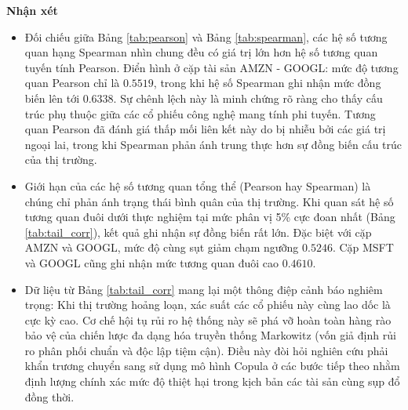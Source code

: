 \begin{flushleft}
\textbf{Nhận xét}
\begin{itemize} 
    \item Đối chiếu giữa Bảng \ref{tab:pearson} và Bảng \ref{tab:spearman}, các hệ số tương quan hạng Spearman nhìn chung đều có giá trị lớn hơn hệ số tương quan tuyến tính Pearson. Điển hình ở cặp tài sản AMZN - GOOGL: mức độ tương quan Pearson chỉ là $0.5519$, trong khi hệ số Spearman ghi nhận mức đồng biến lên tới $0.6338$. Sự chênh lệch này là minh chứng rõ ràng cho thấy cấu trúc phụ thuộc giữa các cổ phiếu công nghệ mang tính phi tuyến. Tương quan Pearson đã đánh giá thấp mối liên kết này do bị nhiễu bởi các giá trị ngoại lai, trong khi Spearman phản ánh trung thực hơn sự đồng biến cấu trúc của thị trường.
    \item Giới hạn của các hệ số tương quan tổng thể (Pearson hay Spearman) là chúng chỉ phản ánh trạng thái bình quân của thị trường. Khi quan sát hệ số tương quan đuôi dưới thực nghiệm tại mức phân vị 5\% cực đoan nhất (Bảng \ref{tab:tail_corr}), kết quả ghi nhận sự đồng biến rất lớn. Đặc biệt với cặp AMZN và GOOGL, mức độ cùng sụt giảm chạm ngưỡng $0.5246$. Cặp MSFT và GOOGL cũng ghi nhận mức tương quan đuôi cao $0.4610$. 
    \item Dữ liệu từ Bảng \ref{tab:tail_corr} mang lại một thông điệp cảnh báo nghiêm trọng: Khi thị trường hoảng loạn, xác suất các cổ phiếu này cùng lao dốc là cực kỳ cao. Cơ chế hội tụ rủi ro hệ thống này sẽ phá vỡ hoàn toàn hàng rào bảo vệ của chiến lược đa dạng hóa truyền thống Markowitz (vốn giả định rủi ro phân phối chuẩn và độc lập tiệm cận). Điều này đòi hỏi nghiên cứu phải khẩn trương chuyển sang sử dụng mô hình Copula ở các bước tiếp theo nhằm định lượng chính xác mức độ thiệt hại trong kịch bản các tài sản cùng sụp đổ đồng thời.
\end{itemize}
\end{flushleft}
